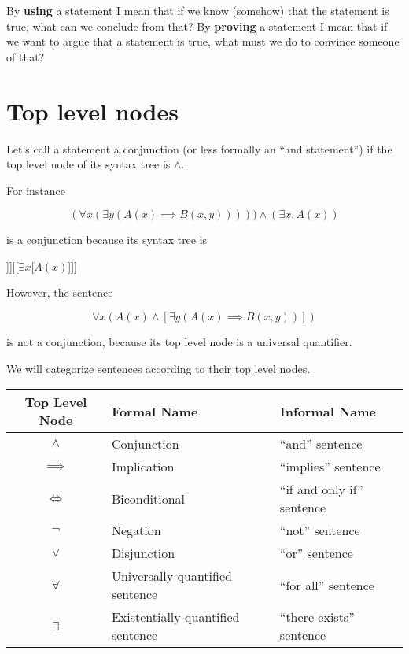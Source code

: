 \documentclass{article}
\newcommand{\equivalent}{\Longleftrightarrow}
\begin{document}
By \textbf{using} a statement I mean that if we know (somehow) that the statement is true, what can we conclude from that?  By \textbf{proving} a statement I mean that if we want to argue that a statement is true, what must we do to convince someone of that?

 

\section{Top level nodes}

Let's call a statement a conjunction (or less formally an ``and statement'') if the top level node of its syntax tree is $\wedge$.

For instance 

$$
(\forall x (\exists y (A(x) \implies B(x,y))))) \wedge (\exists x, A(x))
$$

is a conjunction because its syntax tree is

\begin{center}
	\begin{forest}	
		[$\wedge$[$\forall x$[$\exists y$[$\implies$[$A(x)$][{$B(x,y)$}]]]][$\exists x$[$A(x)$]]]
		\end{forest}
	\end{center}

However, the sentence

$$
\forall x (A(x) \wedge [\exists y (A(x) \implies B(x,y))])
$$

is not a conjunction, because its top level node is a universal quantifier.

We will categorize sentences according to their top level nodes.


\begin{table}[h]
	\centering
	\begin{tabular}{c|l|l}
	Top Level Node & Formal Name & Informal Name 	\\ \hline
	$\wedge$ & Conjunction & ``and'' sentence\\ \hline
	$\implies$ & Implication & ``implies'' sentence\\ \hline
	$\equivalent$ & Biconditional & ``if and only if'' sentence\\ \hline
	$\neg$ & Negation & ``not'' sentence\\ \hline
	$\vee$ & Disjunction & ``or'' sentence\\ \hline
	$\forall$ & Universally quantified sentence & ``for all'' sentence\\ \hline
	$\exists$ & Existentially quantified sentence & ``there exists'' sentence\\ \hline
	\end{tabular}
\end{table}
\end{document}
